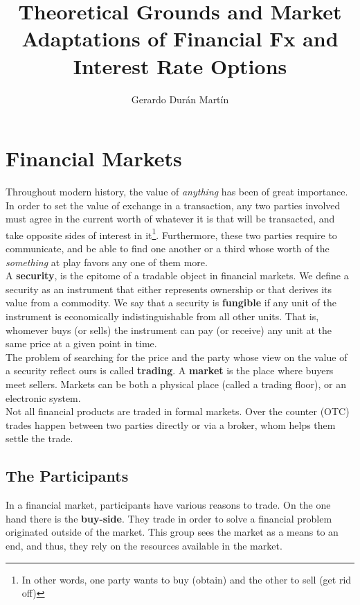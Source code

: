 \documentclass[11pt]{report}
\title{Theoretical Grounds and Market Adaptations of Financial Fx and Interest Rate Options}
\author{Gerardo Dur\'an Mart\'in}
\begin{document}
\tableofcontents

\chapter{Financial Markets}
Throughout modern history, the value of \textit{anything} has been of great importance. In order to set the value of exchange in a transaction, any two parties involved must agree in the current worth of whatever it is that will be transacted, and take opposite sides of interest in it\footnote{In other words, one party wants to buy (obtain) and the other to sell (get rid off)}. Furthermore, these two parties require to communicate, and be able to find one another or a third whose worth of the \textit{something} at play favors any one of them more.\\

A \textbf{security}, is the epitome of a tradable object in financial markets. We define a security as an instrument that either represents ownership or that derives its value from a commodity. We say that a security is \textbf{fungible} if any unit of the instrument is economically indistinguishable from all other units. That is, whomever buys (or sells) the instrument can pay (or receive) any unit at the same price at a given point in time.\\

The problem of searching for the price and the party whose view on the value of a security reflect ours is called \textbf{trading}. A \textbf{market} is the place where buyers meet sellers. Markets can be both a physical place (called a trading floor), or an electronic system.\\

Not all financial products are traded in formal markets. Over the counter (OTC) trades happen between two parties directly or via a broker, whom helps them settle the trade. 

\section{The Participants}
In a financial market, participants have various reasons to trade. On the one hand there is the \textbf{buy-side}. They trade in order to solve a financial problem originated outside of the market. This group sees the market as a means to an end, and thus, they rely on the resources available in the market.\\
\end{document}
